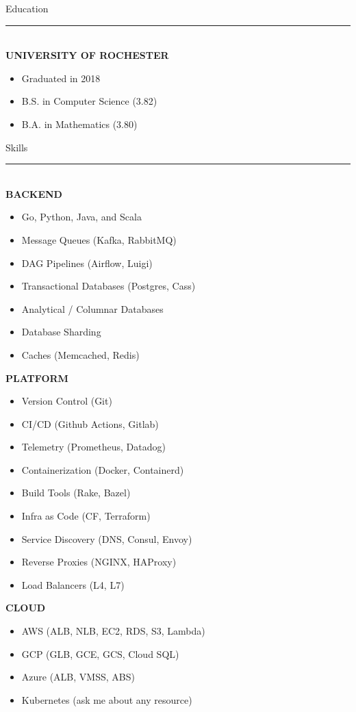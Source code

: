 \documentclass[letterpaper]{article}
\makeatletter
\newcommand{\fillbox}[1]{\resizebox{\textwidth}{!}{\begin{tabular}{@{}l@{}} #1 \end{tabular}}}
\makeatother
\begin{document}
	\noindent{}\noindent
	\begin{bgbox}[height=\paperheight, colback=gray!15, width=0.38\textwidth, left=0.12in, right=0.11in]\raggedright
		\vspace*{-4pt}
		\fillbox{\thin Brandon\\[-6pt] \thin Willett}\vspace*{12pt}
		{\Huge{Education}}\\[-6pt]
		\noindent\rule{\textwidth}{1pt}\\[12pt]
		\textbf{UNIVERSITY OF ROCHESTER}
		\begin{itemize} [noitemsep,topsep=4pt]
			\item Graduated in 2018
			\item B.S. in Computer Science (3.82)
			\item B.A. in Mathematics (3.80)
		\end{itemize}
		\vspace*{20pt}
		{\Huge{Skills}}\\[-6pt]
		\noindent\rule{\textwidth}{1pt}\\[12pt]
		\textbf{BACKEND}
		\begin{itemize} [noitemsep,topsep=4pt]
			\item Go, Python, Java, and Scala
			\item Message Queues (Kafka, RabbitMQ)
			\item DAG Pipelines (Airflow, Luigi)
			\item Transactional Databases (Postgres, Cass)
			\item Analytical / Columnar Databases
			\item Database Sharding
			\item Caches (Memcached, Redis)
		\end{itemize}
		\vspace*{12pt}
		\textbf{PLATFORM}
		\begin{itemize} [noitemsep,topsep=4pt]
			\item Version Control (Git)
			\item CI/CD (Github Actions, Gitlab)
			\item Telemetry (Prometheus, Datadog)
			\item Containerization (Docker, Containerd)
			\item Build Tools (Rake, Bazel)
			\item Infra as Code (CF, Terraform)
			\item Service Discovery (DNS, Consul, Envoy)
			\item Reverse Proxies (NGINX, HAProxy)
			\item Load Balancers (L4, L7)
		\end{itemize}
		\vspace*{12pt}
		\textbf{CLOUD}
		\begin{itemize} [noitemsep,topsep=4pt]
			\item AWS (ALB, NLB, EC2, RDS, S3, Lambda)
			\item GCP (GLB, GCE, GCS, Cloud SQL)
			\item Azure (ALB, VMSS, ABS)
			\item Kubernetes (ask me about any resource)
		\end{itemize}
	\end{bgbox}%
\end{document}
